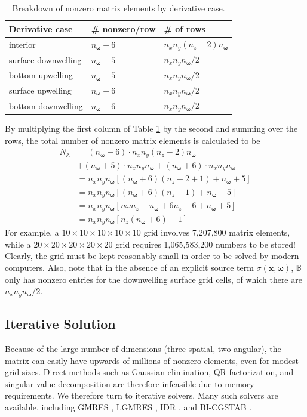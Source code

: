 \documentclass[ms,cpyr,lof,lot]{uathesis}
\renewcommand\vec\bm
\newcommand\nomega{{n_{\vec{\omega}}}}
\providecommand{\DIFaddbegin}{} %
\providecommand{\DIFaddend}{} %
\newcommand{\DIFaddincludegraphics}[2][]{{\color{blue}\fbox{\DIFOincludegraphics[#1]{#2}}}} %
\DeclareRobustCommand{\DIFaddbegin}{\DIFOaddbegin \let\includegraphics\DIFaddincludegraphics} %
\DeclareRobustCommand{\DIFaddend}{\DIFOaddend \let\includegraphics\DIFOincludegraphics} %
\begin{document}
\begin{table}[H]
  \centering
  \caption{Breakdown of nonzero matrix elements by derivative case.}
  \begin{tabular}{p{}p{}p{}}
    \toprule
    \textbf{Derivative case} & \textbf{\# nonzero/row} & \textbf{\# of rows} \\
    \midrule
    interior & $\nomega+6$ & $n_xn_y(n_z-2)\nomega$ \\
    surface downwelling & $\nomega+5$ & $n_xn_y\nomega/2$ \\
    bottom upwelling & $\nomega+5$ & $n_xn_y\nomega/2$ \\
    surface upwelling & $\nomega+6$ & $n_xn_y\nomega/2$ \\
    bottom downwelling & $\nomega+6$ & $n_xn_y\nomega/2$ \\
    \bottomrule
  \end{tabular}
  \label{tab:nonzero}
\end{table}

By multiplying the first column of Table \ref{tab:nonzero} by the second and summing over the rows, the total number of nonzero matrix elements is calculated to be
\begin{align*}
  N_\mathbb{A} &= (\nomega+6) \cdot n_xn_y(n_z-2)\nomega \\
    &+   (\nomega+5) \cdot n_xn_y\nomega
    +   (\nomega+6) \cdot n_xn_y\nomega \\
  &= n_x n_y \nomega \left[(\nomega+6)(n_z-2+1)+\nomega+5 \right] \\
  &= n_x n_y \nomega \left[(\nomega+6)(n_z-1)+\nomega+5 \right] \\
  &=  n_x n_y \nomega \left[n\omega n_z -\nomega + 6n_z - 6 + \nomega + 5 \right] \\
  &=  n_x n_y \nomega \left[n_z(\nomega+6)-1\right]
\end{align*}
For example, a $10 \times 10 \times 10 \times 10 \times 10$ grid involves 7,207,800 matrix elements, while a $20 \times 20 \times 20 \times 20 \times 20$ grid requires 1,065,583,200 numbers to be stored!
Clearly, the grid must be kept reasonably small in order to be solved by modern computers.
Also, note that in the absence of an explicit source term $\sigma(\vec{x}, \vec{\omega})$, $\mathbb{B}$ only has nonzero entries for the downwelling surface grid cells, of which there are $n_x n_y \nomega/2$.

\subsection{Iterative Solution}
\DIFaddbegin \label{sec:iterative_solution}
\DIFaddend Because of the large number of dimensions (three spatial, two angular), the matrix can easily have upwards of millions of nonzero elements,
even for modest grid sizes.
Direct methods such as Gaussian elimination, QR factorization, and singular value decomposition are therefore infeasible due to memory requirements.
We therefore turn to iterative solvers.
Many such solvers are available, including GMRES \cite{saad_gmres:_1985}, LGMRES \cite{baker_technique_2005}, IDR \cite{sonneveld_idrs:_2008}, and BI-CGSTAB \cite{van_der_vorst_bi-cgstab:_1992}.
\end{document}
